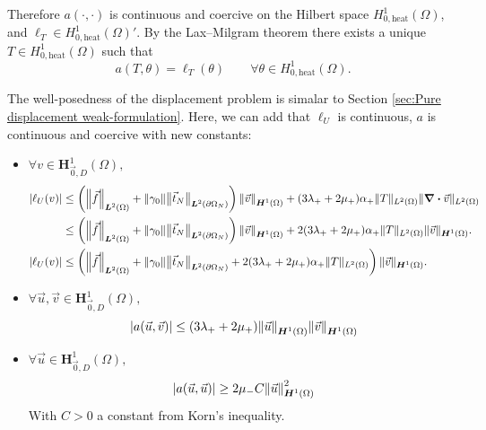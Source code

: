 \documentclass[a4paper,12pt,twoside]{report}
\begin{document}
Therefore $a(\cdot,\cdot)$ is continuous and coercive on the Hilbert space $H^1_{0,\text{heat}}(\Omega)$, and $\ell_T\in H^1_{0,\text{heat}}(\Omega)'$. By the Lax--Milgram theorem there exists a unique $T\in H^1_{0,\text{heat}}(\Omega)$ such that
\[
a(T,\theta)=\ell_T(\theta)\qquad\forall\theta\in H^1_{0,\text{heat}}(\Omega).
\]

The well-posedness of the displacement problem is simalar to Section \ref{sec:Pure displacement weak-formulation}. Here, we can add that $\ell_U$ is continuous, $a$ is continuous and coercive with new constants:
\begin{itemize}
	\item $\forall v \in \boldsymbol{H}^1_{\vec 0,D}(\Omega),$
	\begin{equation*}
	\begin{aligned}
	|\ell_U(v)| & \leq \left( \norm{\vec f}_{\boldsymbol L^2(\Omega)} + \norm{\gamma_0} \norm{\vec t_N}_{\boldsymbol L^2(\partial \Omega_N)}\right)\norm{\vec v}_{\boldsymbol H^1(\Omega)} + (3 \lambda_+ + 2 \mu_+) \alpha_+ \|T\|_{L^2(\Omega)} \|\div \vec v\|_{L^2(\Omega)} \\
	& \leq \left( \norm{\vec f}_{\boldsymbol L^2(\Omega)} + \norm{\gamma_0} \norm{\vec t_N}_{\boldsymbol L^2(\partial \Omega_N)}\right)\norm{\vec v}_{\boldsymbol H^1(\Omega)} + 2(3 \lambda_+ + 2 \mu_+) \alpha_+ \|T\|_{L^2(\Omega)} \|\vec v\|_{\boldsymbol H^1(\Omega)}. \\
	|\ell_U(v)| & \leq \left( \norm{\vec f}_{\boldsymbol L^2(\Omega)} + \norm{\gamma_0} \norm{\vec t_N}_{\boldsymbol L^2(\partial \Omega_N)} + 2(3 \lambda_+ + 2 \mu_+) \alpha_+ \|T\|_{L^2(\Omega)} \right) \|\vec v\|_{\boldsymbol H^1(\Omega)}.
	\end{aligned}
	\end{equation*}
	\item $\forall \vec u, \vec v \in \boldsymbol{H}^1_{\vec 0,D}(\Omega),$
	\begin{equation*}
		\left| a(\vec u, \vec v) \right| \leq (3\lambda_+ + 2\mu_+)\norm{\vec u}_{\boldsymbol H^1(\Omega)}\norm{\vec v}_{\boldsymbol H^1(\Omega)}
	\end{equation*}
	\item $\forall \vec u \in \boldsymbol{H}^1_{\vec 0,D}(\Omega),$
	\begin{equation*}
		\left| a(\vec u, \vec u) \right| \geq 2 \mu_- C \norm{\vec u}_{\boldsymbol{H}^1(\Omega)}^2
	\end{equation*}
	With $C > 0$ a constant from Korn's inequality.
\end{itemize}
\end{document}
